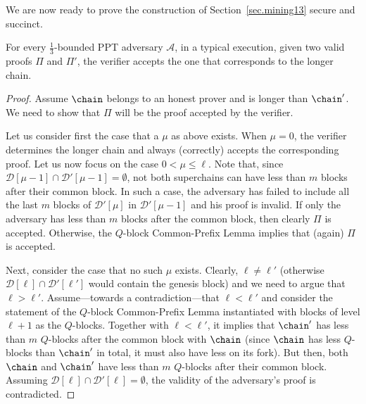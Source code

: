 We are now ready to prove the construction of Section~\ref{sec.mining13} secure
and succinct.

\begin{theorem}
	For every $\frac{1}{3}$-bounded PPT adversary $\mathcal{A}$,
	in a typical execution,
	given two valid proofs $\Pi$ and $\Pi'$, the
	verifier accepts the one that corresponds to the longer chain.
\end{theorem}
\begin{proof}
	Assume $\chain$ belongs to an honest prover and is longer than $\chain'$. We
	need to show that $\Pi$ will be the proof accepted by the verifier.

	Let us consider first the case that a $\mu$ as above exists.
	When $\mu=0$, the verifier determines the longer chain and always
	(correctly) accepts the corresponding proof.
	Let us now focus on the case $0<\mu\le\ell$.
	Note that, since $\mathcal{D}[\mu-1]\cap\mathcal{D}'[\mu-1]=\emptyset$, not both
	superchains can have less than $m$ blocks after their common block. In such
	a case, the adversary has failed to include all the last $m$ blocks of
	$\mathcal{D}'[\mu]$ in $\mathcal{D}'[\mu-1]$ and his proof is invalid.
	If only the adversary has less than $m$ blocks after the common block, then
	clearly $\Pi$ is accepted. Otherwise, the $Q$-block Common-Prefix Lemma
	implies that (again) $\Pi$ is accepted.

	Next, consider the case that no such $\mu$ exists.
	Clearly, $\ell\ne\ell'$ (otherwise $\mathcal{D}[\ell]\cap\mathcal{D}'[\ell']$ would
	contain the genesis block) and we need to argue that $\ell>\ell'$.
	Assume---towards a contradiction---that $\ell<\ell'$ and consider the
	statement of the $Q$-block Common-Prefix Lemma instantiated with blocks of
	level $\ell+1$ as the $Q$-blocks.
	Together with $\ell<\ell'$, it implies that $\chain'$ has less than $m$
	$Q$-blocks after the common block with $\chain$ (since $\chain$ has less
	$Q$-blocks than $\chain'$ in total, it must also have less on its fork).
	But then, both $\chain$ and $\chain'$ have less than $m$ $Q$-blocks after
	their common block. Assuming $\mathcal{D}[\ell]\cap\mathcal{D}'[\ell]=\emptyset$, the
	validity of the adversary's proof is contradicted.
\end{proof}

